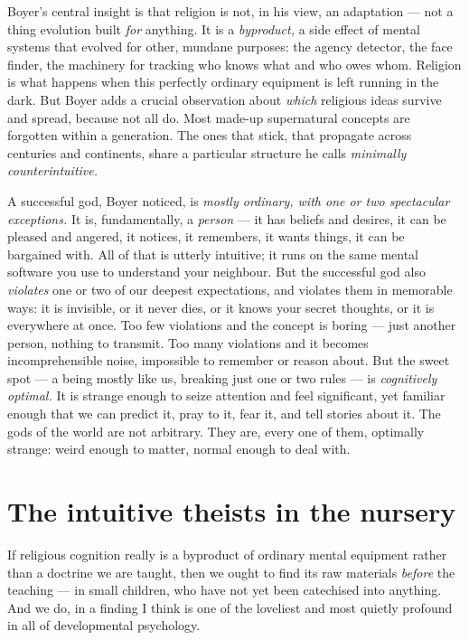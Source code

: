 Boyer's central insight is that religion is not, in his view, an adaptation — not a thing evolution built \emph{for} anything. It is a \emph{byproduct,} a side effect of mental systems that evolved for other, mundane purposes: the agency detector, the face finder, the machinery for tracking who knows what and who owes whom. Religion is what happens when this perfectly ordinary equipment is left running in the dark. But Boyer adds a crucial observation about \emph{which} religious ideas survive and spread, because not all do. Most made-up supernatural concepts are forgotten within a generation. The ones that stick, that propagate across centuries and continents, share a particular structure he calls \emph{minimally counterintuitive.}

A successful god, Boyer noticed, is \emph{mostly ordinary, with one or two spectacular exceptions.} It is, fundamentally, a \emph{person} — it has beliefs and desires, it can be pleased and angered, it notices, it remembers, it wants things, it can be bargained with. All of that is utterly intuitive; it runs on the same mental software you use to understand your neighbour. But the successful god also \emph{violates} one or two of our deepest expectations, and violates them in memorable ways: it is invisible, or it never dies, or it knows your secret thoughts, or it is everywhere at once. Too few violations and the concept is boring — just another person, nothing to transmit. Too many violations and it becomes incomprehensible noise, impossible to remember or reason about. But the sweet spot — a being mostly like us, breaking just one or two rules — is \emph{cognitively optimal.} It is strange enough to seize attention and feel significant, yet familiar enough that we can predict it, pray to it, fear it, and tell stories about it. The gods of the world are not arbitrary. They are, every one of them, optimally strange: weird enough to matter, normal enough to deal with.

\section*{The intuitive theists in the nursery}

If religious cognition really is a byproduct of ordinary mental equipment rather than a doctrine we are taught, then we ought to find its raw materials \emph{before} the teaching — in small children, who have not yet been catechised into anything. And we do, in a finding I think is one of the loveliest and most quietly profound in all of developmental psychology.

